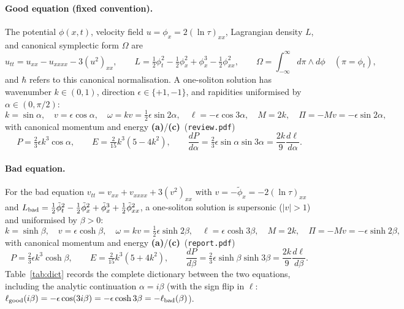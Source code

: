 \documentclass[11pt,a4paper]{article}
\newcommand{\La}{\textsf{\textbf{(a)}}}
\newcommand{\Lc}{\textsf{\textbf{(c)}}}
\theoremstyle{remark}
\begin{document}
\paragraph{Good equation (fixed convention).}
The potential $\phi(x,t)$, velocity field $u=\phi_x=2(\ln\tau)_{xx}$, Lagrangian density $L$, and canonical symplectic form $\Omega$ are
\begin{equation}\label{eq:good_conv}
u_{tt}=u_{xx}-u_{xxxx}-3(u^2)_{xx},\qquad
L=\tfrac12\phi_t^2-\tfrac12\phi_x^2+\phi_x^3-\tfrac12\phi_{xx}^2,\qquad
\Omega=\int_{-\infty}^\infty d\pi\wedge d\phi\quad (\pi=\phi_t),
\end{equation}
and $\hbar$ refers to this canonical normalisation. A one-soliton solution has wavenumber $k\in(0,1)$, direction $\epsilon\in\{+1,-1\}$, and rapidities uniformised by $\alpha\in(0,\pi/2)$:
\begin{equation}\label{eq:good_1sol}
k=\sin\alpha,\quad v=\epsilon\cos\alpha,\quad \omega=kv=\tfrac12\epsilon\sin 2\alpha,\quad \ell=-\epsilon\cos 3\alpha,\quad
M=2k,\quad \Pi=-Mv=-\epsilon\sin 2\alpha,
\end{equation}
with canonical momentum and energy \La/\Lc\ (\texttt{review.pdf})
\begin{equation}\label{eq:good_EP}
P=\tfrac23\epsilon k^3\cos\alpha,\qquad E=\tfrac2{15}k^3(5-4k^2),\qquad
\frac{dP}{d\alpha}=\tfrac23\epsilon\sin\alpha\sin 3\alpha=\frac{2k}{9}\frac{d\ell}{d\alpha}.
\end{equation}

\paragraph{Bad equation.}
For the bad equation $v_{tt}=v_{xx}+v_{xxxx}+3(v^2)_{xx}$ with $v=-\tilde\phi_x=-2(\ln\tau)_{xx}$ and $L_{\rm bad}=\frac12\tilde\phi_t^2-\frac12\tilde\phi_x^2+\tilde\phi_x^3+\frac12\tilde\phi_{xx}^2$, a one-soliton solution is supersonic ($|v|>1$) and uniformised by $\beta>0$:
\begin{equation}\label{eq:bad_1sol}
k=\sinh\beta,\quad v=\epsilon\cosh\beta,\quad \omega=kv=\tfrac12\epsilon\sinh 2\beta,\quad \ell=\epsilon\cosh 3\beta,\quad
M=2k,\quad \Pi=-Mv=-\epsilon\sinh 2\beta,
\end{equation}
with canonical momentum and energy \La/\Lc\ (\texttt{report.pdf})
\begin{equation}\label{eq:bad_EP}
P=\tfrac23\epsilon k^3\cosh\beta,\qquad E=\tfrac2{15}k^3(5+4k^2),\qquad
\frac{dP}{d\beta}=\tfrac23\epsilon\sinh\beta\sinh 3\beta=\frac{2k}{9}\frac{d\ell}{d\beta}.
\end{equation}
Table~\ref{tab:dict} records the complete dictionary between the two equations, including the analytic continuation $\alpha=i\beta$ (with the sign flip in $\ell$: $\ell_{\rm good}(i\beta)=-\epsilon\cos(3i\beta)=-\epsilon\cosh 3\beta=-\ell_{\rm bad}(\beta)$).
\end{document}
